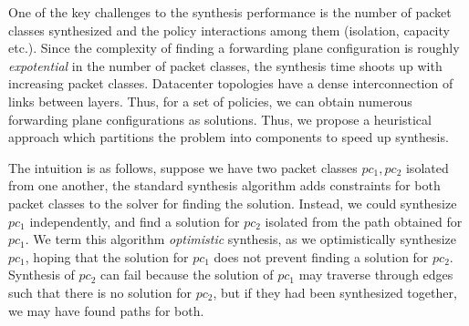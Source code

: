 One of the key challenges to the synthesis performance is the number
of packet classes synthesized and the policy interactions among them
(isolation, capacity etc.). Since the complexity of finding a
forwarding plane configuration is roughly \emph{expotential} in the
number of packet classes, the synthesis time shoots up with increasing
packet classes. Datacenter topologies have a dense interconnection of
links between layers. Thus, for a set of policies, we can obtain
numerous forwarding plane configurations as solutions.
 Thus, we propose a heuristical approach which partitions the problem 
into components to speed up synthesis.

The intuition is as follows, suppose we have two packet classes $pc_1,
pc_2$ isolated from one another, the standard synthesis algorithm adds 
constraints for both packet classes to the solver for finding the solution.
Instead, we could synthesize $pc_1$
independently, and find a solution for $pc_2$ isolated from the
path obtained for $pc_1$. We term this
algorithm \emph{optimistic} synthesis, as we optimistically synthesize
$pc_1$, hoping that the solution for $pc_1$ does not prevent finding a
solution for $pc_2$. Synthesis of $pc_2$ can fail because the solution
of $pc_1$ may traverse through edges such that there is no solution
for $pc_2$, but if they had been synthesized together, we may have
found paths for both.

